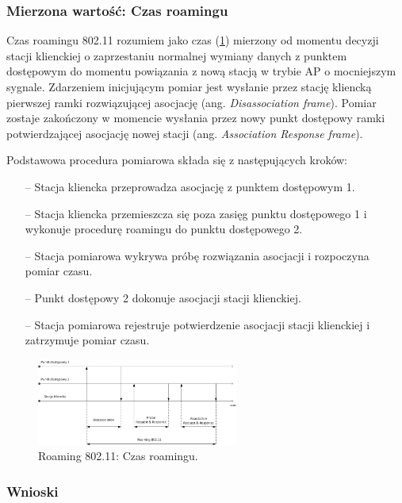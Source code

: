 \subsubsection{Mierzona wartość: Czas roamingu}
Czas roamingu 802.11 rozumiem jako czas (\ref{RoamingTime}) mierzony od momentu decyzji stacji klienckiej o zaprzestaniu normalnej wymiany danych z punktem dostępowym do momentu powiązania z nową stacją w trybie AP o mocniejszym sygnale. Zdarzeniem inicjującym pomiar jest wysłanie przez stację kliencką pierwszej ramki rozwiązującej asocjację (ang. \emph{Disassociation frame}). Pomiar zostaje zakończony w momencie wysłania przez nowy punkt dostępowy ramki potwierdzającej asocjację nowej stacji (ang. \emph{Association Response frame}).

Podstawowa procedura pomiarowa składa się z następujących kroków:
\begin{itemize}
\item[--] Stacja kliencka przeprowadza asocjację z punktem dostępowym 1.
\item[--] Stacja kliencka przemieszcza się poza zasięg punktu dostępowego 1 i wykonuje procedurę roamingu do punktu dostępowego 2.
\item[--] Stacja pomiarowa wykrywa próbę rozwiązania asocjacji i rozpoczyna pomiar czasu.
\item[--] Punkt dostępowy 2 dokonuje asocjacji stacji klienckiej.
\item[--] Stacja pomiarowa rejestruje potwierdzenie asocjacji stacji klienckiej i zatrzymuje pomiar czasu.
\end{itemize}

\begin{figure}[htb]
\begin{center}
\includegraphics[width=250px]{img/RoamingTime}
\caption{Roaming 802.11: Czas roamingu.}
\label{RoamingTime}
\end{center}
\end{figure}

\subsubsection{Wnioski}
